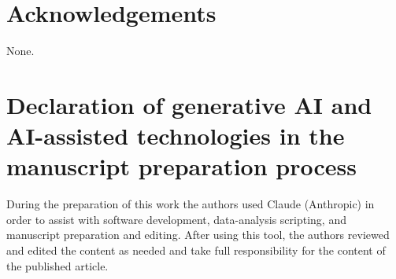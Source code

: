 \documentclass[preprint,11pt]{elsarticle}
\begin{document}
\section*{Acknowledgements}
None.

\section*{Declaration of generative AI and AI-assisted technologies in the
manuscript preparation process}
During the preparation of this work the authors used Claude (Anthropic) in
order to assist with software development, data-analysis scripting, and
manuscript preparation and editing. After using this tool, the authors
reviewed and edited the content as needed and take full responsibility for
the content of the published article.



\end{document}
